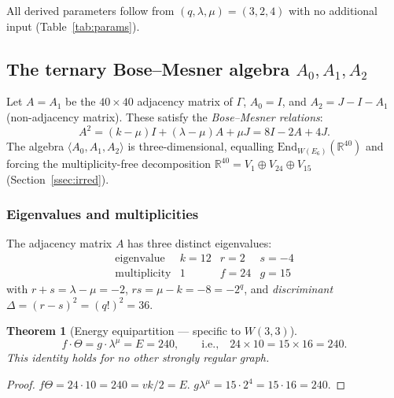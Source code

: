 \documentclass[12pt,a4paper]{article}
\newtheorem{theorem}{Theorem}[section]
\theoremstyle{definition}
\newcommand{\RR}{\mathbb{R}}
\begin{document}
All derived parameters follow from $(q,\lambda,\mu)=(3,2,4)$ with no
additional input (Table~\ref{tab:params}).

\subsection{The ternary Bose--Mesner algebra \texorpdfstring{$A_0,A_1,A_2$}{A0,A1,A2}}

Let $A=A_1$ be the $40\times 40$ adjacency matrix of $\Gamma$, $A_0=I$,
and $A_2 = J-I-A_1$ (non-adjacency matrix).  These satisfy the
\emph{Bose--Mesner relations}:
\begin{equation}
  \label{eq:bm}
  A^2 = (k-\mu)I + (\lambda-\mu)A + \mu J
      = 8I - 2A + 4J.
\end{equation}
The algebra $\langle A_0,A_1,A_2\rangle$ is three-dimensional,
equalling $\mathrm{End}_{W(E_6)}(\RR^{40})$ and forcing the
multiplicity-free decomposition
$\RR^{40}=V_1\oplus V_{24}\oplus V_{15}$ (Section~\ref{ssec:irred}).

\subsubsection{Eigenvalues and multiplicities}

The adjacency matrix $A$ has three distinct eigenvalues:
\begin{equation}
  \renewcommand{\arraystretch}{1.3}
  \begin{array}{c|ccc}
  \text{eigenvalue} & k=12 & r=2 & s=-4 \\
  \hline
  \text{multiplicity} & 1 & f=24 & g=15
  \end{array}
\end{equation}
with $r+s=\lambda-\mu=-2$, $rs=\mu-k=-8=-2^q$, and
\emph{discriminant} $\Delta=(r-s)^2=(q!)^2=36$.

\begin{theorem}[Energy equipartition --- specific to $W(3,3)$]
\label{thm:equi}
\begin{equation}
  \boxed{f\cdot\Theta = g\cdot\lambda^\mu = E = 240},
  \qquad\text{i.e.,}\quad 24\times 10 = 15\times 16 = 240.
\end{equation}
This identity holds for no other strongly regular graph.
\end{theorem}

\begin{proof}
$f\Theta = 24\cdot 10=240=vk/2=E$.
$g\lambda^\mu = 15\cdot 2^4 = 15\cdot 16 = 240$. \qedhere
\end{proof}
\end{document}
